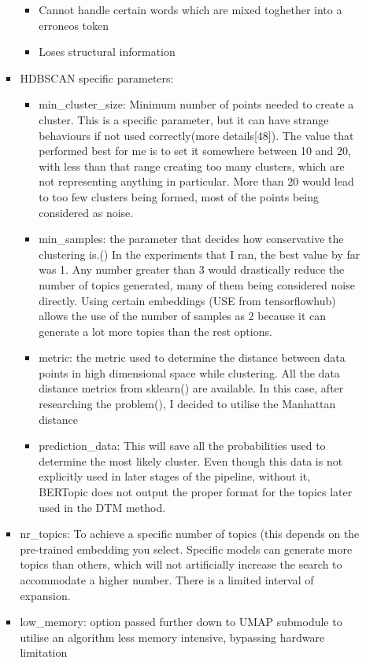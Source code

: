 \documentclass[12pt,MSc,a4paper,oneside]{muthesis}
\begin{document}
\begin{itemize}
\begin{itemize}
\begin{itemize}
\begin{itemize}
                    \item Cannot handle certain words which are mixed toghether into a erroneos token
                    \item Loses structural information
                \end{itemize}
            \item HDBSCAN specific parameters:
                \begin{itemize}
                    \item min\_cluster\_size: Minimum number of points needed to create a cluster. This is a specific parameter, but it can have strange behaviours if not used correctly(more details[48]). The value that performed best for me is to set it somewhere between 10 and 20, with less than that range creating too many clusters, which are not representing anything in particular. More than 20 would lead to too few clusters being formed, most of the points being considered as noise.
                    \item min\_samples: the parameter that decides how conservative the clustering is.(\cite{McInnes2017}) In the experiments that I ran, the best value by far was 1. Any number greater than 3 would drastically reduce the number of topics generated, many of them being considered noise directly. Using certain embeddings (USE from tensorflowhub) allows the use of the number of samples as 2 because it can generate a lot more topics than the rest options.
                    \item metric: the metric used to determine the distance between data points in high dimensional space while clustering. All the data distance metrics from sklearn(\cite{scikit-learn}) are available. In this case, after researching the problem(\cite{Aggarwal2001OnTS}), I decided to utilise the Manhattan distance
                    \item prediction\_data: This will save all the probabilities used to determine the most likely cluster. Even though this data is not explicitly used in later stages of the pipeline, without it, BERTopic does not output the proper format for the topics later used in the DTM method.
                \end{itemize}
            \item nr\_topics: To achieve a specific number of topics (this depends on the pre-trained embedding you select. Specific models can generate more topics than others, which will not artificially increase the search to accommodate a higher number. There is a limited interval of expansion.
            \item low\_memory: option passed further down to UMAP submodule to utilise an algorithm less memory intensive, bypassing hardware limitation
        \end{itemize}
    \end{itemize}
\end{itemize}
\end{document}
